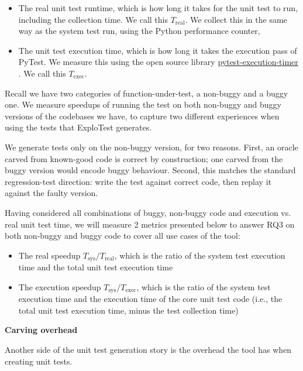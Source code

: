 \begin{itemize}
      \item The real unit test runtime, which is how long it takes for the unit test to run, including the collection
            time. We call this $T_{\text{real}}$. We collect this in the same way as the system test run, using the Python performance counter,

      \item The unit test execution time, which is how long it takes the execution pass of PyTest. We measure this using the open source library
            \href{https://pypi.org/project/pytest-execution-timer/}{pytest-execution-timer} \cite{pytest-exec-timer}. We call this $T_{\text{exec}}$.
\end{itemize}

Recall we have two categories of function-under-test, a non-buggy and a buggy one. We measure speedups of running the test
on both non-buggy and buggy versions of the codebases we have, to capture two different experiences when using the
tests that ExploTest generates.

We generate tests only on the non-buggy version, for two reasons. First, an oracle carved from known-good code is
correct by construction; one carved from the buggy version would encode buggy behaviour.
Second, this matches the standard regression-test direction: write the test against correct code,
then replay it against the faulty version.

Having considered all combinations of buggy, non-buggy code and execution vs. real unit test time, we will measure 2 metrics presented
below to answer RQ3 on both non-buggy and buggy code to cover all use cases of the tool:

\begin{itemize}
      \item The real speedup $T_\text{sys}/T_\text{real}$, which is the ratio of the system test execution time and the total unit test execution time
      \item The execution speedup $T_\text{sys}/T_\text{exec}$, which is the ratio of the system test execution time and the execution time of the core unit test code (i.e., the total unit test execution time, minus the test collection time)
\end{itemize}

\textbf{Carving overhead}

Another side of the unit test generation story is the overhead the tool has when creating unit tests.

